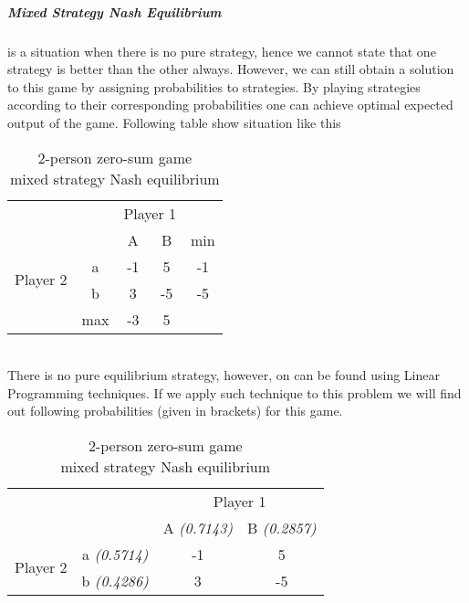 \documentclass[10pt, a4paper]{report}
\begin{document}
\subparagraph{Mixed Strategy Nash Equilibrium} is a situation when there is no pure strategy, hence we cannot state that one strategy is better than the other always. However, we can still obtain a solution to this game by assigning probabilities to strategies. By playing strategies according to their corresponding probabilities one can achieve optimal expected output of the game. Following table show situation like this
\begin{table}[ht!]
	\hspace{-2em}
	\centering
	\begin{tabular}{cccc|c}
		& & \multicolumn{2}{c}{Player 1} &                                \\ \cline{3-4}
		& & A & \multicolumn{1}{c}{B} & min                               \\ \cline{3-4}
		\multirow{2}{*}{Player 2} & \multicolumn{1}{|c|}{a} & -1 & 5 & -1 \\
		& \multicolumn{1}{|c|}{b} & 3 & -5 & -5                           \\ \cline{3-4}
		& max & -3 & \multicolumn{1}{c}{5} &
	\end{tabular}
	\caption{2-person zero-sum game\\mixed strategy Nash equilibrium}
\end{table}
\\
There is no pure equilibrium strategy, however, on can be found using Linear Programming techniques. If we apply such technique to this problem we will find out following probabilities (given in brackets) for this game.
\begin{table}[ht!]
	\hspace{-2em}
	\centering
	\begin{tabular}{cccc|}
		& & \multicolumn{2}{c}{Player 1}                                               \\ \cline{3-4}
		& & A \textit{(0.7143)}& \multicolumn{1}{c}{B \textit{(0.2857)}}               \\ \cline{3-4}
		\multirow{2}{*}{Player 2} & \multicolumn{1}{|c|}{a \textit{(0.5714)}} & -1 & 5 \\
		& \multicolumn{1}{|c|}{b \textit{(0.4286)}} & 3 & -5                           \\ \cline{3-4}
	\end{tabular}
	\caption{2-person zero-sum game\\mixed strategy Nash equilibrium}
\end{table}
\end{document}
